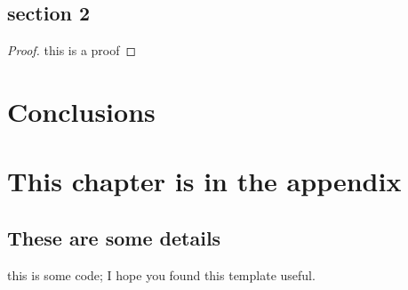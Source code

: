 \documentclass[12pt, a4paper]{report}
\newenvironment{code}
{\footnotesize\verbatim}{\endverbatim\normalfont}
\theoremstyle{definition}
\theoremstyle{definition}%
\theoremstyle{definition}%
\theoremstyle{definition}%
\theoremstyle{definition}%
\theoremstyle{definition}%
\begin{document}
\section{section 2}
\begin{proof}
this is a proof
\end{proof}


\chapter{Conclusions}


\appendix

\chapter{This chapter is in the appendix}
\section{These are some details}
\begin{code}
this is some code;
I hope you found this template useful.
\end{code}


\bibliomatter




 
 
\end{document}
